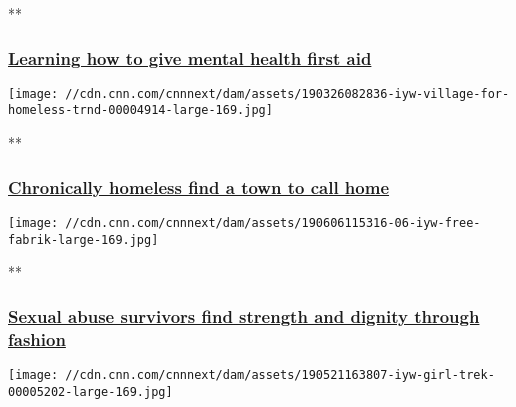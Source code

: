 **

\hypertarget{learning-how-to-give-mental-health-first-aid-}{%
\subsubsection{\texorpdfstring{\href{/videos/health/2019/06/18/iyw-mental-health-first-aid-trnd.cnn/video/playlists/impact-your-world/}{Learning
how to give mental health first aid
}}{Learning how to give mental health first aid }}\label{learning-how-to-give-mental-health-first-aid-}}

\href{/videos/tv/2019/03/25/iyw-village-for-homeless-trnd.cnn/video/playlists/impact-your-world/}{}

\texttt{[image: //cdn.cnn.com/cnnnext/dam/assets/190326082836-iyw-village-for-homeless-trnd-00004914-large-169.jpg]}

**

\hypertarget{chronically-homeless-find-a-town-to-call-home}{%
\subsubsection{\texorpdfstring{\href{/videos/tv/2019/03/25/iyw-village-for-homeless-trnd.cnn/video/playlists/impact-your-world/}{Chronically
homeless find a town to call
home}}{Chronically homeless find a town to call home}}\label{chronically-homeless-find-a-town-to-call-home}}

\href{/videos/tv/2019/06/05/iyw-free-fabrik.cnn/video/playlists/impact-your-world/}{}

\texttt{[image: //cdn.cnn.com/cnnnext/dam/assets/190606115316-06-iyw-free-fabrik-large-169.jpg]}

**

\hypertarget{sexual-abuse-survivors-find-strength-and-dignity-through-fashion-}{%
\subsubsection{\texorpdfstring{\href{/videos/tv/2019/06/05/iyw-free-fabrik.cnn/video/playlists/impact-your-world/}{Sexual
abuse survivors find strength and dignity through fashion
}}{Sexual abuse survivors find strength and dignity through fashion }}\label{sexual-abuse-survivors-find-strength-and-dignity-through-fashion-}}

\href{/videos/tv/2019/05/21/iyw-girl-trek.cnn/video/playlists/impact-your-world/}{}

\texttt{[image: //cdn.cnn.com/cnnnext/dam/assets/190521163807-iyw-girl-trek-00005202-large-169.jpg]}

